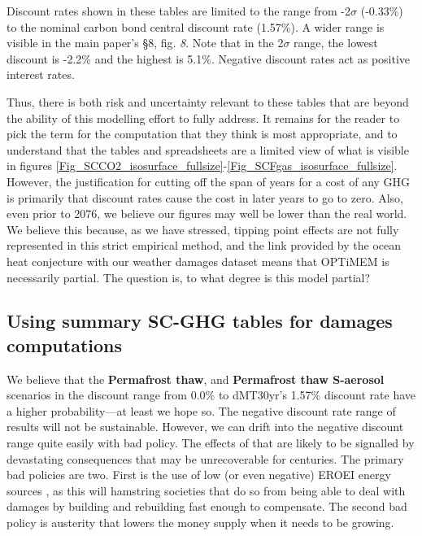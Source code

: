 \documentclass{article}
\begin{document}
Discount rates shown in these tables are limited to the range from -2$\sigma$  (-0.33\%) to the nominal carbon bond central discount rate (1.57\%). A wider range is visible in the main paper's \S8, fig. \emph{8}. Note that in the 2$\sigma$ range, the lowest discount is -2.2\% and the highest is 5.1\%. Negative discount rates act as positive interest rates.

Thus, there is both risk and uncertainty relevant to these tables that are beyond the ability of this modelling effort to fully address. It remains for the reader to pick the term for the computation that they think is most appropriate, and to understand that the tables and spreadsheets are a limited view of what is visible in figures \ref{Fig_SCCO2_isosurface_fullsize}-\ref{Fig_SCFgas_isosurface_fullsize}. However, the justification for cutting off the span of years for a cost of any GHG is primarily that discount rates cause the cost in later years to go to zero. Also, even prior to 2076, we believe our figures may well be lower than the real world.  We believe this because, as we have stressed, tipping point effects are not fully represented in this strict empirical method, and the link provided by the ocean  heat conjecture with our weather damages dataset means that OPTiMEM is necessarily partial. The question is, to what degree is this model partial?  

\subsection{Using summary SC-GHG tables for damages computations}

We believe that the \textbf{Permafrost thaw}, and \textbf{Permafrost thaw S-aerosol} scenarios in the discount range from 0.0\% to dMT30yr's 1.57\% discount rate have a higher probability---at least we hope so. The negative discount rate range of results will not be sustainable. However, we can drift into the negative discount range quite easily with bad policy. The effects of that are likely to be signalled by devastating consequences that may be unrecoverable for centuries. The primary bad policies are two. First is the use of low (or even negative) EROEI energy sources \cite{Notton2018IntermittentRenewables,Allison2023InadequacyOfWind,Tverberg2021FossilFuelProblem,Clack2017MZJrebuttal}, as this will hamstring societies that do so from being able to deal with damages by building and rebuilding fast enough to compensate. The second bad policy is austerity that lowers the money supply when it needs to be growing. 
\end{document}

